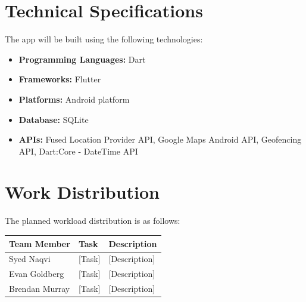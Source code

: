 \documentclass{article}
\begin{document}
\section{Technical Specifications}
The app will be built using the following technologies:
\begin{itemize}
    \item \textbf{Programming Languages:} Dart
    \item \textbf{Frameworks:} Flutter
    \item \textbf{Platforms:} Android platform
    \item \textbf{Database:} SQLite
    \item \textbf{APIs:} Fused Location Provider API, Google Maps Android API, Geofencing API, Dart:Core - DateTime API
\end{itemize}

\section{Work Distribution}
The planned workload distribution is as follows:\\

\begin{tabular}{|p{3cm}|p{4cm}|p{7cm}|}
    \hline
    \textbf{Team Member} & \textbf{Task} & \textbf{Description} \\
    \hline
    Syed Naqvi      & [Task] & [Description] \\
    Evan Goldberg   & [Task] & [Description] \\
    Brendan Murray  & [Task] & [Description] \\
    \hline
\end{tabular}

\newpage
\end{document}
